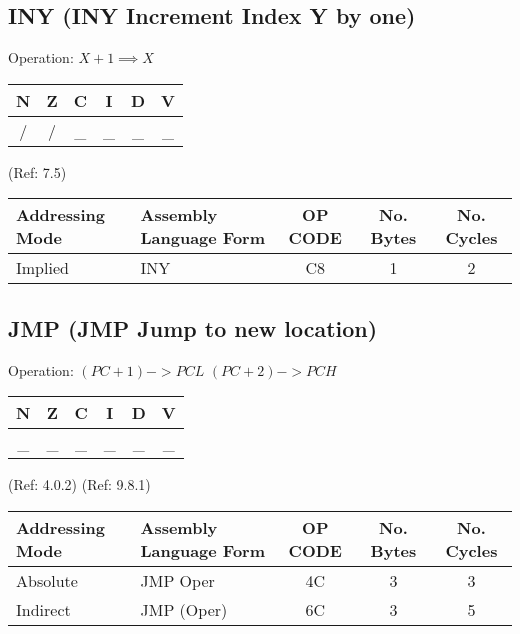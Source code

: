 \documentclass{article}
\begin{document}
  \subsection{INY (INY Increment Index Y by one)}

  Operation:  $X + 1 \implies X$
  \begin{table}[H]
  \centering
  \begin{tabular}{|c c c c c c|}
  \hline
  N&Z&C&I&D&V\\
  \hline
  / & / & \_ & \_ & \_ & \_\\
  \hline
  \end{tabular}
  \end{table}
                                   (Ref: 7.5)
  \begin{table}[H]
  \centering
  \begin{tabular}{|l|l|c|c|c|}
  \hline
   Addressing Mode& Assembly Language Form& OP CODE &No. Bytes&No. Cycles\\
  \hline
    Implied       &   INY                 &    C8   &    1    &    2     \\
  \hline
  \end{tabular}
  \end{table}

  \subsection{JMP (JMP Jump to new location)}

  Operation:  $(PC + 1) -> PCL$
              $(PC + 2) -> PCH$
  \begin{table}[H]
  \centering
  \begin{tabular}{|c c c c c c|}
  \hline
  N&Z&C&I&D&V\\
  \hline
  \_ & \_ & \_ & \_ & \_ & \_\\
  \hline
  \end{tabular}
  \end{table}
                                (Ref: 4.0.2)
                                (Ref: 9.8.1)
  \begin{table}[H]
  \centering
  \begin{tabular}{|l|l|c|c|c|}
  \hline
   Addressing Mode& Assembly Language Form& OP CODE &No. Bytes&No. Cycles\\
  \hline
    Absolute      &   JMP Oper            &    4C   &    3    &    3     \\
    Indirect      &   JMP (Oper)          &    6C   &    3    &    5     \\
  \hline
  \end{tabular}
  \end{table}
\end{document}
